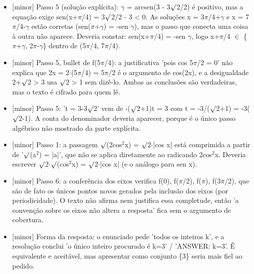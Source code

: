 \documentclass{article}%
\begin{document}
\begin{itemize}%
\item%
{[}minor{]} Passo 5 (solução explícita): $\gamma$ = arcsen(3 - 3$\surd$2/2) é positivo, mas a equação exige sen(x+$\pi$/4) = 3$\surd$2/2 - 3 < 0. As soluções x = 3$\pi$/4+$\gamma$ e x = 7$\pi$/4-$\gamma$ estão corretas (sen($\pi$+$\gamma$) = -sen $\gamma$), mas o passo que conecta uma coisa à outra não aparece. Deveria constar: sen(x+$\pi$/4) = -sen $\gamma$, logo x+$\pi$/4 $\in$ \{$\pi$+$\gamma$, 2$\pi$-$\gamma$\} dentro de (5$\pi$/4, 7$\pi$/4).%
\item%
{[}minor{]} Passo 5, bullet de f(5$\pi$/4): a justificativa 'pois cos 5$\pi$/2 = 0' não explica que 2x = 2$\cdot$(5$\pi$/4) = 5$\pi$/2 é o argumento de cos(2x), e a desigualdade 2+$\surd$2 > 3 usa $\surd$2 > 1 sem dizê{-}lo. Ambas as conclusões são verdadeiras, mas o texto é cifrado para quem lê.%
\item%
{[}minor{]} Passo 5: 't = 3-3$\surd$2' vem de -($\surd$2+1)t = 3 com t = -3/($\surd$2+1) = -3($\surd$2-1). A conta do denominador deveria aparecer, porque é o único passo algébrico não mostrado da parte explícita.%
\item%
{[}minor{]} Passo 1: a passagem $\surd$(2cos$^2$x) = $\surd$2$\cdot$|cos x| está comprimida a partir de '$\surd$(a$^2$) = |a|', que não se aplica diretamente ao radicando 2cos$^2$x. Deveria escrever $\surd$2$\cdot$$\surd$(cos$^2$x) = $\surd$2$\cdot$|cos x| (e o análogo para sen x).%
\item%
{[}minor{]} Passo 6: a conferência dos eixos verifica f(0), f($\pi$/2), f($\pi$), f(3$\pi$/2), que são de fato os únicos pontos novos gerados pela inclusão dos eixos (por periodicidade). O texto não afirma nem justifica essa completude, então 'a convenção sobre os eixos não altera a resposta' fica sem o argumento de cobertura.%
\item%
{[}minor{]} Forma da resposta: o enunciado pede 'todos os inteiros k', e a resolução conclui 'o único inteiro procurado é k=3' / 'ANSWER: k=3'. É equivalente e aceitável, mas apresentar como conjunto \{3\} seria mais fiel ao pedido.%
\end{itemize}%
\end{document}
